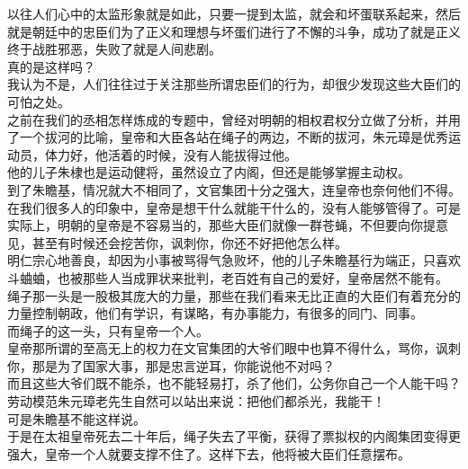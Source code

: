 \begin{multicols}{\theparacolNo}
以往人们心中的太监形象就是如此，只要一提到太监，就会和坏蛋联系起来，然后就是朝廷中的忠臣们为了正义和理想与坏蛋们进行了不懈的斗争，成功了就是正义终于战胜邪恶，失败了就是人间悲剧。\\

真的是这样吗？\\

我认为不是，人们往往过于关注那些所谓忠臣们的行为，却很少发现这些大臣们的可怕之处。\\

之前在我们的丞相怎样炼成的专题中，曾经对明朝的相权君权分立做了分析，并用了一个拔河的比喻，皇帝和大臣各站在绳子的两边，不断的拔河，朱元璋是优秀运动员，体力好，他活着的时候，没有人能拔得过他。\\

他的儿子朱棣也是运动健将，虽然设立了内阁，但还是能够掌握主动权。\\

到了朱瞻基，情况就大不相同了，文官集团十分之强大，连皇帝也奈何他们不得。\\

在我们很多人的印象中，皇帝是想干什么就能干什么的，没有人能够管得了。可是实际上，明朝的皇帝是不容易当的，那些大臣们就像一群苍蝇，不但要向你提意见，甚至有时候还会挖苦你，讽刺你，你还不好把他怎么样。\\

明仁宗心地善良，却因为小事被骂得气急败坏，他的儿子朱瞻基行为端正，只喜欢斗蛐蛐，也被那些人当成罪状来批判，老百姓有自己的爱好，皇帝居然不能有。\\

绳子那一头是一股极其庞大的力量，那些在我们看来无比正直的大臣们有着充分的力量控制朝政，他们有学识，有谋略，有办事能力，有很多的同门、同事。\\

而绳子的这一头，只有皇帝一个人。\\

皇帝那所谓的至高无上的权力在文官集团的大爷们眼中也算不得什么，骂你，讽刺你，那是为了国家大事，那是忠言逆耳，你能说他不对吗？\\

而且这些大爷们既不能杀，也不能轻易打，杀了他们，公务你自己一个人能干吗？\\

劳动模范朱元璋老先生自然可以站出来说：把他们都杀光，我能干！\\

可是朱瞻基不能这样说。\\

于是在太祖皇帝死去二十年后，绳子失去了平衡，获得了票拟权的内阁集团变得更强大，皇帝一个人就要支撑不住了。这样下去，他将被大臣们任意摆布。\\


\end{multicols}
